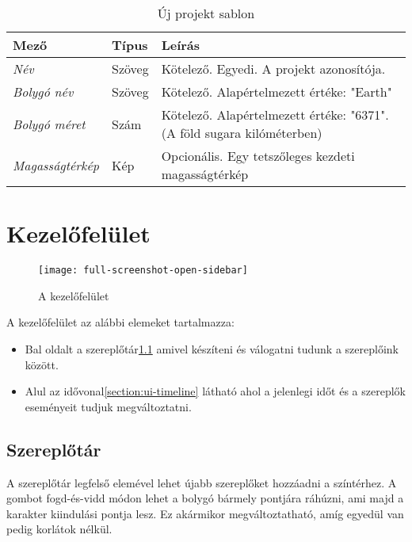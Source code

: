 \begin{table}[H]
	\centering
	\begin{tabular}{ | m{} | m{} | m{} | }
		\hline
		\textbf{Mező} & \textbf{Típus} & \textbf{Leírás} \\
		\hline \hline
		\emph{Név} & Szöveg & Kötelező. Egyedi. A projekt azonosítója. \\
		\hline
		\emph{Bolygó név} & Szöveg & Kötelező. Alapértelmezett értéke: "Earth" \\
		\hline
		\emph{Bolygó méret} & Szám & Kötelező. Alapértelmezett értéke: "6371". (A föld sugara kilóméterben)  \\
		\hline
		\emph{Magasságtérkép} & Kép & Opcionális. Egy tetszőleges kezdeti magasságtérkép  \\
		\hline
	\end{tabular}
	\caption{Új projekt sablon}
	\label{tab:create-project-form}
\end{table}


\section{Kezelőfelület} \label{section:ui}

\begin{figure}[h!]
	\centering
	\texttt{[image: full-screenshot-open-sidebar]}
	\caption{
		A kezelőfelület}
	\label{fig:full-screenshot-open-sidebar}
\end{figure}

A kezelőfelület az alábbi elemeket tartalmazza:

\begin{itemize}
	\item Bal oldalt a szereplőtár\cref{section:ui-actor-tool} amivel készíteni és válogatni tudunk a szereplőink között.
	\item Alul az idővonal\cref{section:ui-timeline} látható ahol a jelenlegi időt és a szereplők eseményeit tudjuk megváltoztatni.
\end{itemize}

\subsection{Szereplőtár} \label{section:ui-actor-tool}

A szereplőtár legfelső elemével lehet újabb szereplőket hozzáadni a színtérhez. A gombot fogd-és-vidd módon lehet a bolygó bármely pontjára ráhúzni, ami majd a karakter kiindulási pontja lesz. Ez akármikor megváltoztatható, amíg egyedül van pedig korlátok nélkül.

